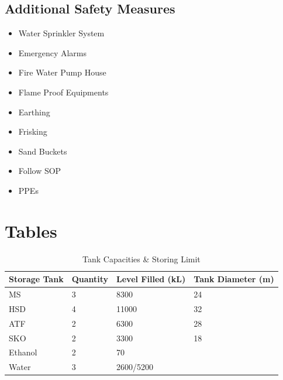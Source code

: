\documentclass{report}
\begin{document}
	\subsection{Additional Safety Measures}
	\begin{itemize}
		\item Water Sprinkler System
		\item Emergency Alarms
		\item Fire Water Pump House
		\item Flame Proof Equipments
		\item Earthing
		\item Frisking
		\item Sand Buckets
		\item Follow SOP
		\item PPEs
	\end{itemize}
	
	\clearpage
	\pagebreak
	\section{Tables}
	\begin{table}[h]
		\centering
		\begin{tabular}{@{}llll@{}}
			\toprule
			\textbf{Storage Tank} & \textbf{Quantity} & \textbf{Level Filled (kL)} & \textbf{Tank Diameter (m)} \\ \midrule
			MS                    & 3                 & 8300                       & 24                         \\
			HSD                   & 4                 & 11000                      & 32                         \\
			ATF                   & 2                 & 6300                       & 28                         \\
			SKO                   & 2                 & 3300                       & 18                         \\
			Ethanol               & 2                 & 70                         &                            \\
			Water                 & 3                 & 2600/5200                  &                            \\ \bottomrule
		\end{tabular}
	\caption{Tank Capacities \& Storing Limit}
	\label{bareja_tank_cap}
	\end{table}
	\clearpage
	\pagebreak
\end{document}
